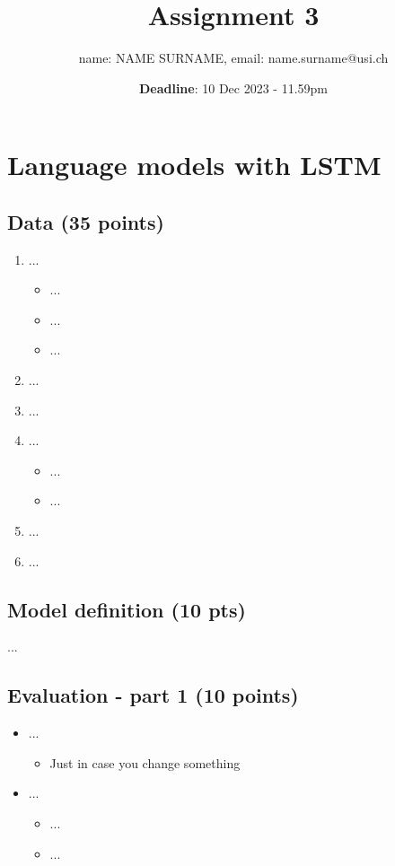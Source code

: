 \documentclass[a4paper]{article}
\title{Assignment 3}
\date{\textbf{Deadline}: 10 Dec 2023 - 11.59pm}
\author{name: NAME SURNAME, email: name.surname@usi.ch}
\begin{document}
\maketitle

\section*{Language models with LSTM}
\subsection*{Data (35 points)}
\begin{enumerate}
    \item ...
    \begin{itemize}
        \item ...
        \item ...
        \item ...
    \end{itemize}
    \item ...
    
    \item ...
    \item ...
    \begin{itemize}
        \item ...
        \item ...
    \end{itemize}
    \item ...
    \item ...
\end{enumerate}

\subsection*{Model definition (10 pts)}
...

\subsection*{Evaluation - part 1 (10 points)}
\begin{itemize}
    \item ...
\begin{itemize}
    \item Just in case you change something
\end{itemize}
\item ...
\begin{itemize}
    \item ...
    \item ...
\end{itemize}
\end{itemize}
\end{document}
